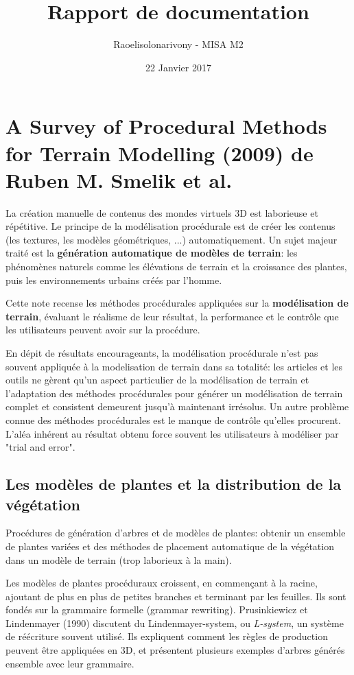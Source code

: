 \documentclass[11pt]{article}
\title{Rapport de documentation}
\author{Raoelisolonarivony - MISA M2}
\date{22 Janvier 2017}
\begin{document}
\maketitle

\section*{A Survey of Procedural Methods for Terrain Modelling (2009) de Ruben M. Smelik et al.}

La création manuelle de contenus des mondes virtuels 3D est laborieuse et répétitive. 
Le principe de la modélisation procédurale est de créer les contenus (les textures, les modèles géométriques, ...) automatiquement. Un sujet majeur traité est la \textbf{génération automatique de modèles de terrain}: les phénomènes naturels comme les élévations de terrain et la croissance des plantes, puis les environnements urbains créés par l'homme. \newline

 Cette note recense les méthodes procédurales appliquées sur la \textbf{modélisation de terrain}, évaluant le réalisme de leur résultat, la performance et le contrôle que les utilisateurs peuvent avoir sur la procédure. \newline
 
 En dépit de résultats encourageants, la modélisation procédurale n'est pas souvent appliquée à la modelisation de terrain dans sa totalité: les articles et les outils ne gèrent qu'un aspect particulier de la modélisation de terrain et l'adaptation des méthodes procédurales pour générer un modélisation de terrain complet et consistent demeurent jusqu'à maintenant irrésolus. Un autre problème connue des méthodes procédurales est le manque de contrôle qu'elles procurent. L'aléa inhérent au résultat obtenu force souvent les utilisateurs à modéliser par "trial and error". 


\subsection*{Les modèles de plantes et la distribution de la végétation}

Procédures de génération d'arbres et de modèles de plantes: obtenir un ensemble de plantes variées et des méthodes de placement automatique de la végétation dans un modèle de terrain (trop laborieux à la main).

Les modèles de plantes procéduraux croissent, en commençant à la racine, ajoutant de plus en plus de petites branches et terminant par les feuilles. Ils sont fondés sur la grammaire formelle (grammar rewriting). Prusinkiewicz et Lindenmayer (1990) discutent du Lindenmayer-system, ou \textit{L-system}, un système de réécriture souvent utilisé. Ils expliquent comment les règles de production peuvent être appliquées en 3D, et présentent plusieurs exemples d'arbres générés ensemble avec leur grammaire. \newline
\end{document}
